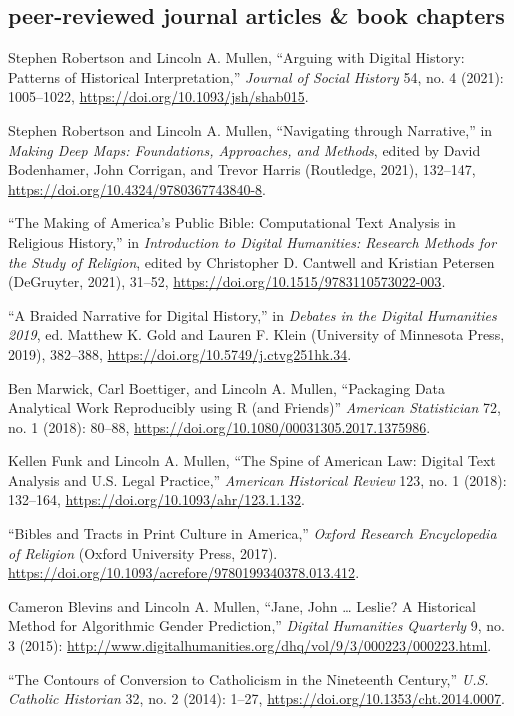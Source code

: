 \documentclass[11pt]{article}
\begin{document}
\subsection{peer-reviewed journal articles \& book chapters}\label{peer-reviewed}

Stephen Robertson and Lincoln A. Mullen, ``Arguing with Digital History: 
Patterns of Historical Interpretation,'' \emph{Journal of Social History} 54, 
no. 4 (2021): 1005--1022, \url{https://doi.org/10.1093/jsh/shab015}.

Stephen Robertson and Lincoln A. Mullen, ``Navigating through Narrative,'' in 
\emph{Making Deep Maps: Foundations, Approaches, and Methods}, edited by David 
Bodenhamer, John Corrigan, and Trevor Harris (Routledge, 2021), 132--147, 
\url{https://doi.org/10.4324/9780367743840-8}.

``The Making of America's Public Bible: Computational Text Analysis in Religious History,'' in \emph{Introduction to Digital Humanities: Research Methods for the Study of Religion}, edited by Christopher D. Cantwell and 
Kristian Petersen (DeGruyter, 2021), 31--52, \url{https://doi.org/10.1515/9783110573022-003}.

``A Braided Narrative for Digital History,'' in \emph{Debates in the Digital Humanities 2019}, ed. Matthew K. Gold and Lauren F. Klein (University of Minnesota Press, 2019), 382--388, \url{ https://doi.org/10.5749/j.ctvg251hk.34}.

Ben Marwick, Carl Boettiger, and Lincoln A. Mullen, ``Packaging Data Analytical Work Reproducibly using R (and Friends)'' \emph{American Statistician} 72, no. 1 (2018): 80--88, \url{https://doi.org/10.1080/00031305.2017.1375986}.

Kellen Funk and Lincoln A. Mullen, ``The Spine of American Law: Digital Text Analysis and U.S. Legal Practice,'' \emph{American Historical Review} 123, no.  1 (2018): 132--164, \url{https://doi.org/10.1093/ahr/123.1.132}.

``Bibles and Tracts in Print Culture in America,'' \emph{Oxford Research Encyclopedia of Religion} (Oxford University Press, 2017). \url{ https://doi.org/10.1093/acrefore/9780199340378.013.412}.

Cameron Blevins and Lincoln A. Mullen, ``Jane, John \ldots{} Leslie? A Historical Method for Algorithmic Gender Prediction,'' \emph{Digital Humanities Quarterly} 9, no. 3 (2015): \url{http://www.digitalhumanities.org/dhq/vol/9/3/000223/000223.html}. 

``The Contours of Conversion to Catholicism in the Nineteenth Century,'' \emph{U.S. Catholic Historian} 32, no. 2 (2014): 1--27, \url{https://doi.org/10.1353/cht.2014.0007}. 
\end{document}
